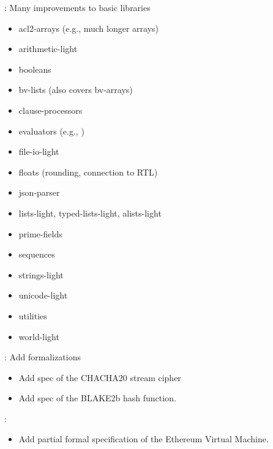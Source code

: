 \begin{frame}

\implibtitle

: Many improvements to basic libraries
\begin{itemize}
\item acl2-arrays (e.g., much longer arrays)
\item arithmetic-light
\item booleans
\item bv-lists (also covers bv-arrays)
\item clause-processors
\item evaluators (e.g., )
\item file-io-light
\item floats (rounding, connection to RTL)
\item json-parser
\item lists-light, typed-lists-light, alists-light
\item prime-fields
\item sequences
\item strings-light
\item unicode-light
\item utilities
\item world-light

\end{itemize}

\end{frame}


\begin{frame}

\implibtitle

: Add formalizations
\begin{itemize}
\item Add spec of the CHACHA20 stream cipher
\item Add spec of the BLAKE2b hash function.
\end{itemize}

\end{frame}


\begin{frame}

\implibtitle

:
\begin{itemize}
\item Add partial formal specification of the Ethereum Virtual Machine.
\end{itemize}

\end{frame}

